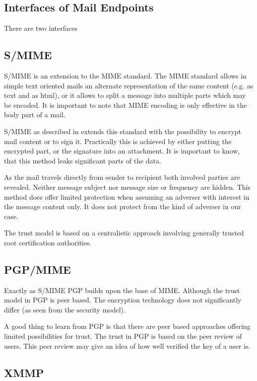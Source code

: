 \subsection{Interfaces of Mail Endpoints}
There are two interfaces 


\subsection{S/MIME}
S/MIME is an extension to the MIME standard. The MIME standard allows in simple text oriented mails an alternate representation of the same content (e.g. as text and as html), or it allows to split a message into multiple parts which may be encoded. It is important to note that MIME encoding is only effective in the body part of a mail.

S/MIME as described in \cite{RFC3851} extends this standard with the possibility to encrypt mail content or to sign it. Practically this is achieved by either putting the encrypted part, or the signature into an attachment. It is important to know, that this method leaks significant parts of the data.

As the mail travels directly from sender to recipient both involved parties are revealed. Neither message subject nor message size or frequency are hidden. This method does offer limited protection when assuming an adverser with interest in the message content only. It does not protect from the kind of adverser in our case. 

The trust model is based on a centralistic approach involving generally trusted root certification authorities.

\subsection{PGP/MIME}
Exactly as S/MIME PGP\cite{RFC2440} builds upon the base of MIME. Although the trust model in PGP is peer based. The encryption technology does not significantly differ (as seen from the security model).

A good thing to learn from PGP is that there are peer based approaches offering limited possibilities for trust. The trust in PGP is based on the peer review of users. This peer review may give an idea of how well verified the key of a user is.


\subsection{XMMP}

